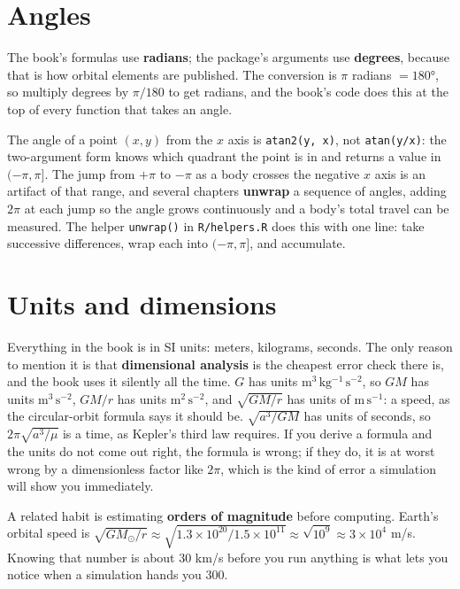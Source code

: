 \documentclass[
  10.5pt,
  letterpaper,
]{scrbook}
\theoremstyle{plain}
\theoremstyle{remark}
\begin{document}
\section{Angles}\label{angles}

The book's formulas use \textbf{radians}; the package's arguments use
\textbf{degrees}, because that is how orbital elements are published.
The conversion is \(\pi\) radians \(= 180°\), so multiply degrees by
\(\pi/180\) to get radians, and the book's code does this at the top of
every function that takes an angle.

The angle of a point \((x, y)\) from the \(x\) axis is
\texttt{atan2(y,\ x)}, not \texttt{atan(y/x)}: the two-argument form
knows which quadrant the point is in and returns a value in
\((-\pi, \pi]\). The jump from \(+\pi\) to \(-\pi\) as a body crosses
the negative \(x\) axis is an artifact of that range, and several
chapters \textbf{unwrap} a sequence of angles, adding \(2\pi\) at each
jump so the angle grows continuously and a body's total travel can be
measured. The helper \texttt{unwrap()} in \texttt{R/helpers.R} does this
with one line: take successive differences, wrap each into
\((-\pi, \pi]\), and accumulate.

\section{Units and dimensions}\label{units-and-dimensions}

Everything in the book is in SI units: meters, kilograms, seconds. The
only reason to mention it is that \textbf{dimensional analysis} is the
cheapest error check there is, and the book uses it silently all the
time. \(G\) has units \(\mathrm{m^3\,kg^{-1}\,s^{-2}}\), so \(GM\) has
units \(\mathrm{m^3\,s^{-2}}\), \(GM/r\) has units
\(\mathrm{m^2\,s^{-2}}\), and \(\sqrt{GM/r}\) has units of
\(\mathrm{m\,s^{-1}}\): a speed, as the circular-orbit formula says it
should be. \(\sqrt{a^3/GM}\) has units of seconds, so
\(2\pi\sqrt{a^3/\mu}\) is a time, as Kepler's third law requires. If you
derive a formula and the units do not come out right, the formula is
wrong; if they do, it is at worst wrong by a dimensionless factor like
\(2\pi\), which is the kind of error a simulation will show you
immediately.

A related habit is estimating \textbf{orders of magnitude} before
computing. Earth's orbital speed is
\(\sqrt{GM_\odot/r} \approx \sqrt{1.3\times10^{20}/1.5\times10^{11}} \approx \sqrt{10^9} \approx 3\times10^4\)
m/s. Knowing that number is about 30 km/s before you run anything is
what lets you notice when a simulation hands you 300.
\end{document}
